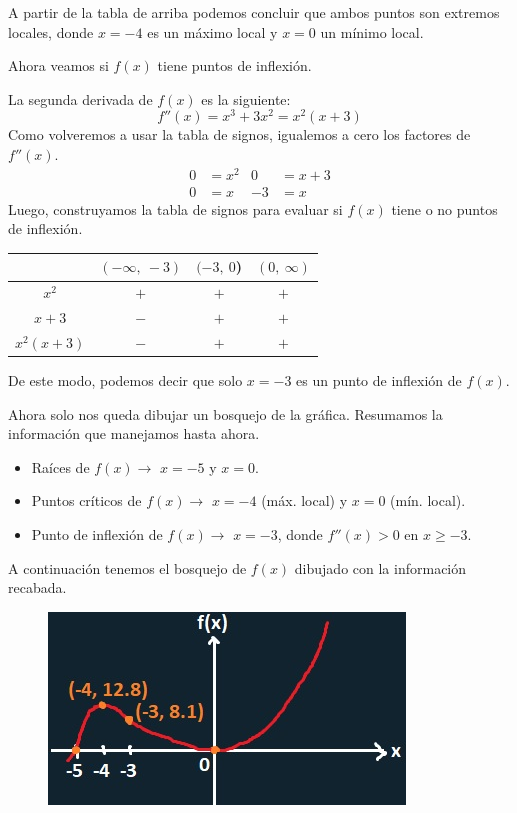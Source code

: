 \documentclass[12pt]{article}
\begin{document}
A partir de la tabla de arriba podemos concluir que ambos puntos son extremos locales, donde $x = -4$ es un máximo local y $x = 0$ un mínimo local.

Ahora veamos si $f(x)$ tiene puntos de inflexión.

La segunda derivada de $f(x)$ es la siguiente:
\[
f''(x) = x^{3} + 3x^{2} = x^{2}(x + 3)
\]
Como volveremos a usar la tabla de signos, igualemos a cero los factores de $f''(x)$.
\begin{align*}
0 &= x^{2} & 0 &= x + 3 \\
0 &= x & -3 &= x
\end{align*}
Luego, construyamos la tabla de signos para evaluar si $f(x)$ tiene o no puntos de inflexión.

\begin{table}[hbt!]
\centering

{\renewcommand{\arraystretch}{1.3}
\begin{tabular}{c c c c}
 & $(-\infty, \ -3)$ & $(-3, \ 0$) & $(0, \ \infty)$ \\
\hline
$x^{2}$ & $+$ & $+$ & $+$ \\
$x + 3$ & $-$ & $+$ & $+$ \\
\hline
$x^{2}(x + 3)$ & $-$ & $+$ & $+$ \\
\end{tabular}
}

\end{table}


De este modo, podemos decir que solo $x = -3$ es un punto de inflexión de $f(x)$.

Ahora solo nos queda dibujar un bosquejo de la gráfica. Resumamos la información que manejamos hasta ahora.

\begin{itemize}
\item Raíces de $f(x) \rightarrow$ $x = -5$ y $x = 0$.
\item Puntos críticos de $f(x) \rightarrow$ $x = -4$ (máx. local) y $x = 0$ (mín. local).
\item Punto de inflexión de $f(x) \rightarrow$  $x = -3$, donde $f''(x) > 0$ en $x \geq -3$.
\end{itemize}

A continuación tenemos el bosquejo de $f(x)$ dibujado con la información recabada.%

\begin{figure}[hbt!]
\centering
\includegraphics[scale=0.7]{img/final-draft-plot-2.jpg}
\end{figure}
\end{document}
